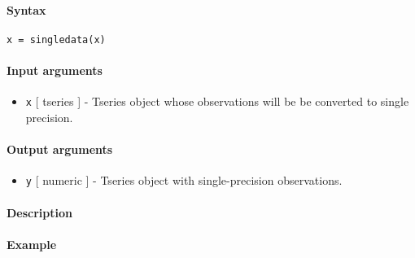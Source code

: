 


	\paragraph{Syntax}\label{syntax}

\begin{verbatim}
x = singledata(x)
\end{verbatim}

\paragraph{Input arguments}\label{input-arguments}

\begin{itemize}
\itemsep1pt\parskip0pt
\item
  \texttt{x} {[} tseries {]} - Tseries object whose observations will be
  be converted to single precision.
\end{itemize}

\paragraph{Output arguments}\label{output-arguments}

\begin{itemize}
\itemsep1pt\parskip0pt
\item
  \texttt{y} {[} numeric {]} - Tseries object with single-precision
  observations.
\end{itemize}

\paragraph{Description}\label{description}

\paragraph{Example}\label{example}


